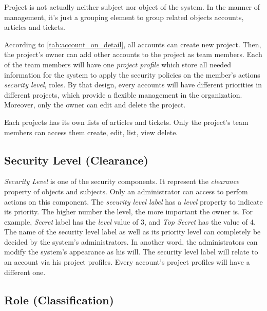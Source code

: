 Project is not actually neither subject nor object of the system.
In the manner of management, it's just a grouping element to group related objects \eg accounts, articles and tickets.

According to \autoref{tab:account_on_detail}, all accounts can create new project.
Then, the project's owner can add other accounts to the project as team members.
Each of the team members will have one \emph{project profile} which store all needed information for the system to apply the security policies on the member's actions \eg \emph{security level}, roles.
By that design, every accounts will have different priorities in different projects, which provide a flexible management in the organization.
Moreover, only the owner can edit and delete the project.

Each projects has its own lists of articles and tickets.
Only the project's team members can access them \eg create, edit, list, view delete.


\subsection{Security Level (Clearance)}
\label{ch:hopot_project:project_components:security_level}

\emph{Security Level} is one of the security components.
It represent the \emph{clearance} property of objects and subjects.
Only an administrator can access to perfom actions on this component.
The \emph{security level label} has a \emph{level} property to indicate its priority.
The higher number the level, the more important the owner is.
For example, \emph{Secret} label has the \emph{level} value of 3, and \emph{Top Secret} has the value of 4.
The name of the security level label as well as its priority level can completely be decided by the system's administrators.
In another word, the administrators can modify the system's appearance as his will. 
The security level label will relate to an account via his project profiles. Every account's project profiles will have a different one.


\subsection{Role (Classification)}
\label{ch:hopot_project:role}

